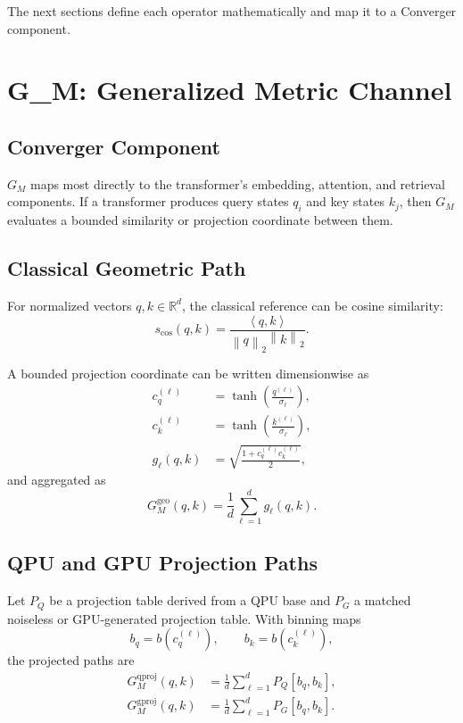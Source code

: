 \documentclass[11pt]{article}
\newcommand{\R}{\mathbb{R}}
\newcommand{\norm}[1]{\left\lVert #1 \right\rVert}
\newcommand{\ip}[2]{\left\langle #1,#2 \right\rangle}
\newcommand{\Gm}{G_M}
\newcommand{\geo}{\mathrm{geo}}
\newcommand{\qproj}{\mathrm{qproj}}
\newcommand{\gproj}{\mathrm{gproj}}
\begin{document}
The next sections define each operator mathematically and map it to a Converger
component.

\section{G\_M: Generalized Metric Channel}

\subsection{Converger Component}

\(\Gm\) maps most directly to the transformer's embedding, attention, and
retrieval components. If a transformer produces query states \(q_i\) and key
states \(k_j\), then \(\Gm\) evaluates a bounded similarity or projection
coordinate between them.

\subsection{Classical Geometric Path}

For normalized vectors \(q,k \in \R^d\), the classical reference can be cosine
similarity:
\begin{equation}
  s_{\cos}(q,k) =
  \frac{\ip{q}{k}}{\norm{q}_2 \norm{k}_2}.
\end{equation}

A bounded projection coordinate can be written dimensionwise as
\begin{align}
  c_q^{(\ell)} &= \tanh\!\left(\frac{q^{(\ell)}}{\sigma_\ell}\right), \\
  c_k^{(\ell)} &= \tanh\!\left(\frac{k^{(\ell)}}{\sigma_\ell}\right), \\
  g_\ell(q,k) &= \sqrt{\frac{1+c_q^{(\ell)}c_k^{(\ell)}}{2}},
\end{align}
and aggregated as
\begin{equation}
  \Gm^{\geo}(q,k) =
  \frac{1}{d}\sum_{\ell=1}^{d} g_\ell(q,k).
\end{equation}

\subsection{QPU and GPU Projection Paths}

Let \(P_Q\) be a projection table derived from a QPU base and \(P_G\) a matched
noiseless or GPU-generated projection table. With binning maps
\[
  b_q = b(c_q^{(\ell)}), \qquad b_k = b(c_k^{(\ell)}),
\]
the projected paths are
\begin{align}
  \Gm^{\qproj}(q,k) &=
  \frac{1}{d}\sum_{\ell=1}^{d} P_Q[b_q,b_k],\\
  \Gm^{\gproj}(q,k) &=
  \frac{1}{d}\sum_{\ell=1}^{d} P_G[b_q,b_k].
\end{align}
\end{document}
